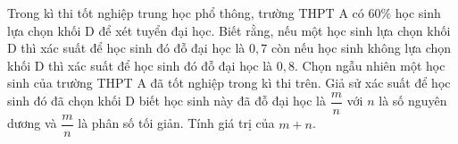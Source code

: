 \begin{ex}
Trong kì thi tốt nghiệp trung học phổ thông, trường THPT A có $60\%$ học sinh lựa chọn khối D để xét tuyển đại học. Biết rằng, nếu một học sinh lựa chọn khối D thì xác suất để học sinh đó đỗ đại học là $0{,}7$ còn nếu học sinh không lựa chọn khối D thì xác suất để học sinh đó đỗ đại học là $0{,}8$. Chọn ngẫu nhiên một học sinh của trường THPT A đã tốt nghiệp trong kì thi trên. Giả sử xác suất để học sinh đó đã chọn khối D biết học sinh này đã đỗ đại học là $\dfrac mn$ với $n$ là số nguyên dương và $\dfrac mn$ là phân số tối giản. Tính giá trị của $m+n$.
\end{ex}
